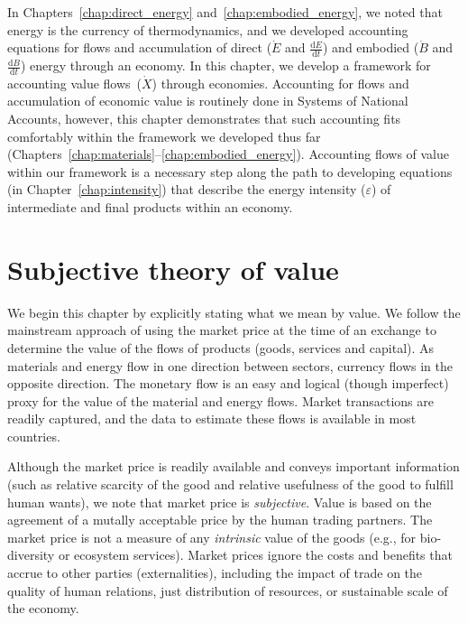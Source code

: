 In Chapters~\ref{chap:direct_energy} and~\ref{chap:embodied_energy}, 
we noted that energy is the currency of thermodynamics,
and we developed accounting equations for flows and accumulation of 
direct ($\dot{E}$ and $\frac{\mathrm{d}E}{\mathrm{d}t}$) 
and embodied ($\dot{B}$ and $\frac{\mathrm{d}B}{\mathrm{d}t}$) 
energy through an economy.
In this chapter, we develop a framework for accounting
value flows~($\dot{X}$) through economies.
Accounting for flows and accumulation of economic value is 
routinely done in Systems of National Accounts,
however, this chapter demonstrates that such accounting
fits comfortably within the framework we developed thus far
(Chapters~\ref{chap:materials}--\ref{chap:embodied_energy}).
Accounting flows of value within our framework is a necessary step along
the path to developing equations (in Chapter~\ref{chap:intensity}) 
that describe the energy intensity ($\varepsilon$) of intermediate
and final products within an economy.


\section{Subjective theory of value}
\label{sec:theory_of_value}


We begin this chapter by explicitly stating what we mean by value. 
We follow the mainstream approach 
of using the market price at the time of an exchange
to determine the value of the flows of products (goods, services and capital). 
As materials and energy flow in one direction between sectors, 
currency flows in the opposite direction. 
The monetary flow is an easy and logical (though imperfect)
proxy for the value of the material and energy flows. 
Market transactions are readily captured, 
and the data 
to estimate these flows is available in most countries.\cite{IIOA-Data}

Although the market price is readily available and conveys important information (such as
relative scarcity of the good and relative usefulness of the good to fulfill human wants), we note that market
price is \emph{subjective}.  
Value is based on the agreement of a mutally acceptable price 
by the human trading partners. 
The market price
is not a measure of any \emph{intrinsic}
value of the goods (e.g., for bio-diversity or ecosystem services). 
Market prices ignore the costs and benefits that accrue 
to other parties (externalities), 
including the impact of trade on the quality of human relations, 
just distribution of resources, 
or sustainable scale of the economy.\cite[p.~55]{Daly1997} 


